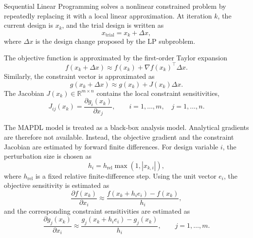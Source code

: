 \documentclass[11pt,a4paper]{article}
\begin{document}
Sequential Linear Programming solves a nonlinear constrained problem
by repeatedly replacing it with a local linear approximation. At
iteration $k$, the current design is $x_k$, and the trial design is
written as
\begin{equation}
\label{eq:appA_trial_design}
    x_{\text{trial}} = x_k + \Delta x ,
\end{equation}
where $\Delta x$ is the design change proposed by the LP subproblem.

The objective function is approximated by the first-order Taylor
expansion
\begin{equation}
\label{eq:appA_lin_f}
    f(x_k + \Delta x)
    \approx
    f(x_k) + \nabla f(x_k)^{\!\top}\Delta x .
\end{equation}
Similarly, the constraint vector is approximated as
\begin{equation}
\label{eq:appA_lin_g}
    g(x_k + \Delta x)
    \approx
    g(x_k) + J(x_k)\Delta x .
\end{equation}
The Jacobian $J(x_k) \in \mathbb{R}^{m \times n}$ contains the local
constraint sensitivities,
\begin{equation}
\label{eq:appA_jacobian}
    J_{ij}(x_k)
    =
    \frac{\partial g_i(x_k)}{\partial x_j},
    \qquad
    i = 1,\dots,m,\quad j = 1,\dots,n .
\end{equation}

The MAPDL model is treated as a black-box analysis model. Analytical
gradients are therefore not available. Instead, the objective
gradient and the constraint Jacobian are estimated by forward finite
differences. For design variable $i$, the perturbation size is chosen
as
\begin{equation}
\label{eq:appA_fd_step}
    h_i =
    h_{\mathrm{rel}}
    \max\left(1, |x_{k,i}|\right),
\end{equation}
where $h_{\mathrm{rel}}$ is a fixed relative finite-difference step.
Using the unit vector $e_i$, the objective sensitivity is estimated
as
\begin{equation}
\label{eq:appA_fd_f}
    \frac{\partial f(x_k)}{\partial x_i}
    \approx
    \frac{
        f(x_k + h_i e_i) - f(x_k)
    }{h_i},
\end{equation}
and the corresponding constraint sensitivities are estimated as
\begin{equation}
\label{eq:appA_fd_g}
    \frac{\partial g_j(x_k)}{\partial x_i}
    \approx
    \frac{
        g_j(x_k + h_i e_i) - g_j(x_k)
    }{h_i},
    \qquad j = 1,\dots,m .
\end{equation}
\end{document}
